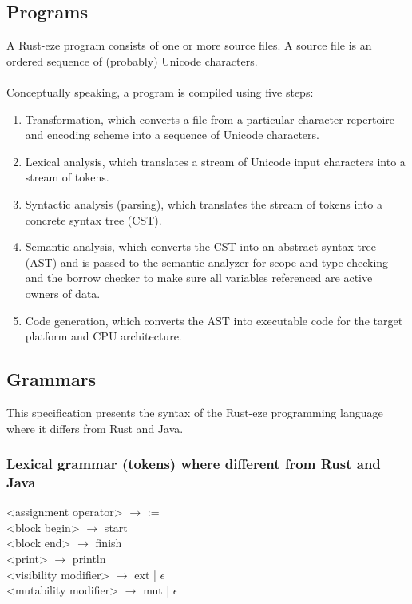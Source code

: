 \documentclass[letterpaper, 10pt, DIV=13]{scrartcl}
\numberwithin{equation}{section}
\numberwithin{figure}{section}
\numberwithin{table}{section}
\begin{document}
\subsection{Programs}
A Rust-eze program consists of one or more source files. A source file is an
ordered sequence of (probably) Unicode characters. 
\\ \\
Conceptually speaking, a program is compiled using five steps:
\begin{enumerate}
    \item Transformation, which converts a file from a particular character
          repertoire and encoding scheme into a sequence of Unicode characters.
    \item Lexical analysis, which translates a stream of Unicode input
          characters into a stream of tokens.
    \item Syntactic analysis (parsing), which translates the stream of tokens
          into a concrete syntax tree (CST).
    \item Semantic analysis, which converts the CST into an abstract syntax tree
          (AST) and is passed to the semantic analyzer for scope and type
          checking and the borrow checker to make sure all variables
          referenced are active owners of data.
    \item Code generation, which converts the AST into executable code for the
          target platform and CPU architecture.
\end{enumerate}
\subsection{Grammars}
This specification presents the syntax of the Rust-eze programming language
where it differs from Rust and Java.
\subsubsection{Lexical grammar (tokens) where different from Rust and Java}
<assignment operator> $\rightarrow$ := \\
<block begin> $\rightarrow$ start \\
<block end> $\rightarrow$ finish \\
<print> $\rightarrow$ println \\
<visibility modifier> $\rightarrow$ ext | $\epsilon$ \\
<mutability modifier> $\rightarrow$ mut | $\epsilon$ \\
\end{document}
